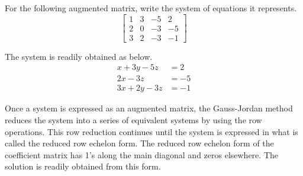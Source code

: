 \begin{example}
    For the following augmented matrix, write the system of equations it represents.
    \[
        \left[
            \begin{array}{ccc|c}
                1 & 3 & -5 & 2  \\
                2 & 0 & -3 & -5 \\
                3 & 2 & -3 & -1
            \end{array}
            \right]
    \]
\end{example}
\begin{solution}
    The system is readily obtained as below.
    \begin{align*}
        x + 3y - 5z  & = 2  \\
        2x      - 3z & = -5 \\
        3x + 2y - 3z & = -1
    \end{align*}
\end{solution}
Once a system is expressed as an augmented matrix, the Gauss-Jordan method reduces the system into a series of equivalent systems by using the row operations. This row reduction continues until the system is expressed in what is called the reduced row echelon form. The reduced row echelon form of the coefficient matrix has 1's along the main diagonal and zeros elsewhere. The solution is readily obtained from this form.

